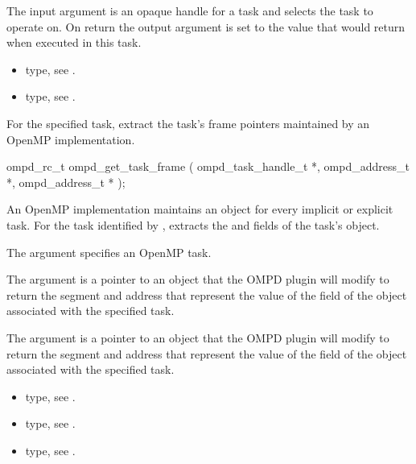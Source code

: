 \argdesc
The input argument  is an opaque handle for a task and selects the task to operate on.
On return the output argument  is set to the value that  would return when
executed in this task.

\crossreferences
\begin{itemize}
	\item {} type, see .
	\item {} type, see .
\end{itemize}



%
\label{ompd:ompd_get_task_frame}
\summary
For the specified task, extract the task's frame pointers maintained by an OpenMP implementation.

\format
\begin{cspecific}
\begin{ompSyntax}
ompd_rc_t ompd_get_task_frame (
  ompd_task_handle_t *,
  ompd_address_t *,
  ompd_address_t *
);
\end{ompSyntax}
\end{cspecific}



\descr
An OpenMP implementation  maintains an  object for every implicit or explicit task. 
For the task identified by ,  extracts 
the  and  fields of the task's  object.

\argdesc

The argument  specifies an OpenMP task.

The argument  is a pointer to an  object that the OMPD plugin will 
modify to return the segment and address that represent the value of the  
field of the  object associated with the specified task.

The argument  is a pointer to an  object that the OMPD plugin will 
modify to return the segment and address that represent the value of the  
field of the  object associated with the specified task.

\crossreferences
\begin{itemize}
	\item {} type, see .
	\item {} type, see .
	\item {} type, see .
\end{itemize}


